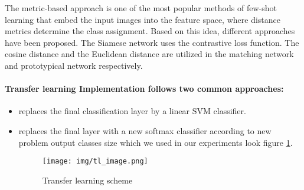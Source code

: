 \documentclass[10pt,twocolumn,letterpaper]{article}
\begin{document}
The metric-based approach is one of the most popular methods of few-shot learning that embed the input images into the feature space, where distance metrics determine the class assignment. Based on this idea, different approaches have been proposed. The Siamese network \cite{SiameseNN} uses the contrastive loss function. The cosine distance  and the Euclidean distance  are utilized in the matching network and prototypical network respectively.

\paragraph{Transfer learning Implementation follows two common approaches:}
\begin{itemize}
\item replaces the final classification layer by a linear SVM classifier. 
\item replaces the final layer with a new softmax classifier according to new problem output classes size which we used in our experiments look figure \ref{figure:tl_archit_image}.

\begin{figure}[h]
\centering
\texttt{[image: img/tl\_image.png]}
\caption{Transfer learning scheme \cite{transfer-learning} \label{figure:tl_archit_image}}
\end{figure}
\end{itemize}
\end{document}
